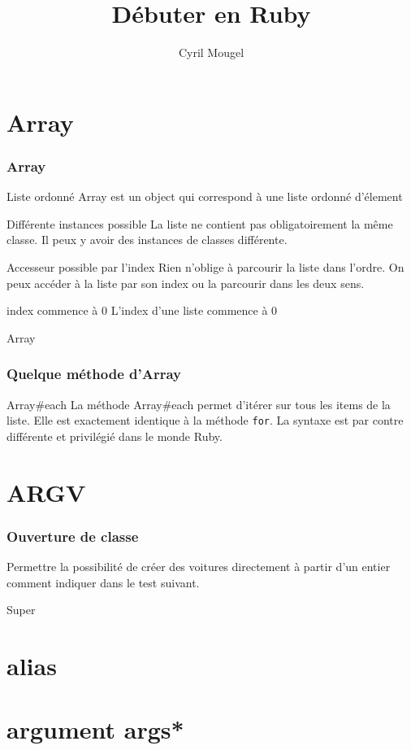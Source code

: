 \documentclass{beamer}
\title{D\'ebuter en Ruby}
\author{Cyril Mougel}
\begin{document}
\begin{frame}
  \titlepage
\end{frame}


\section{Array}

\begin{frame}
  \frametitle{Array}
  \begin{block}{Liste ordonn\'e}
    Array est un object qui correspond à une liste ordonn\'e d'\'element
  \end{block}
  \begin{block}{Diff\'erente instances possible}
    La liste ne contient pas obligatoirement la même classe. Il peux y avoir des instances de classes diff\'erente.
  \end{block}
  \begin{block}{Accesseur possible par l'index}
    Rien n'oblige à parcourir la liste dans l'ordre. On peux acc\'eder à la liste par son index ou la parcourir dans les deux sens.
  \end{block}
  \begin{block}{index commence à 0}
    L'index d'une liste commence à 0
  \end{block}
\end{frame}

\begin{frame}
  \begin{beamerboxesrounded}{Array}
    
  \end{beamerboxesrounded}
\end{frame}

\begin{frame}
  \frametitle{Quelque m\'ethode d'Array}
  \begin{block}{Array#each}
    La m\'ethode Array#each permet d'it\'erer sur tous les items de la liste. Elle est exactement identique à la m\'ethode \verb?for?. La syntaxe est par contre diff\'erente et privil\'egi\'e dans le monde Ruby.
  \end{block}
\end{frame}

\section{ARGV}


\begin{frame}
  \frametitle{Ouverture de classe}
  Permettre la possibilit\'e de cr\'eer des voitures directement à partir d'un entier comment indiquer dans le test suivant.
\end{frame}
\begin{frame}
  \begin{beamerboxesrounded}{Super}
    
  \end{beamerboxesrounded}
\end{frame}

\section{alias}
\section{argument args*}
\end{document}
